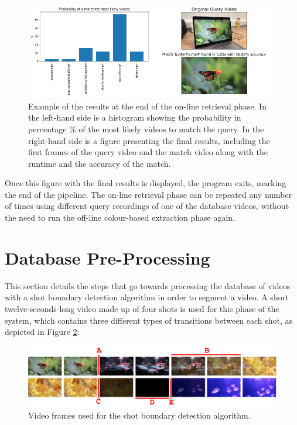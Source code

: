 \begin{figure}[h] 
\centerline{\includegraphics[width=\textwidth]{figures/implementation/online-retrieval-results.png}}
\caption{\label{fig:implementation-online-retrieval-results}Example of the results at the end of the on-line retrieval phase. In the left-hand side is a histogram showing the probability in percentage \% of the most likely videos to match the query. In the right-hand side is a figure presenting the final results, including the first frames of the query video and the match video along with the runtime and the accuracy of the match.}
\end{figure}

Once this figure with the final results is displayed, the program exits, marking the end of the pipeline. The on-line retrieval phase can be repeated any number of times using different query recordings of one of the database videos, without the need to run the off-line colour-based extraction phase again.


\section{Database Pre-Processing}
\label{sec:database-pre-processing}

This section details the steps that go towards processing the database of videos with a shot boundary detection algorithm in order to segment a video. A short twelve-seconds long video made up of four shots is used for this phase of the system, which contains three different types of transitions between each shot, as depicted in Figure \ref{fig:shot_boundary_detection_frames}:

\begin{figure}[h] 
\centerline{\includegraphics[width=\textwidth]{figures/implementation/shot_boundary_detection_frames.png}}
\caption{\label{fig:shot_boundary_detection_frames}Video frames used for the shot boundary detection algorithm.}
\end{figure}

